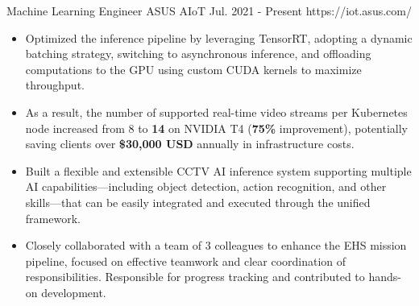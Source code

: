 

\begin{cventries}

\cventryexp
{Machine Learning Engineer} %
{ASUS AIoT} %
{Jul. 2021 - Present} %
{https://iot.asus.com/}
{
    \begin{cvitems} %
        \begin{itemize}
            \item Optimized the inference pipeline by leveraging TensorRT, adopting a 
            dynamic batching strategy, switching to asynchronous inference, and offloading 
            computations to the GPU using custom CUDA kernels to maximize throughput. 
            \item As a result, the number of supported real-time video streams per 
            Kubernetes node increased from 8 to \textbf{14} on NVIDIA T4 (\textbf{75\%} improvement), potentially 
            saving clients over \textbf{\$30,000 USD} annually in infrastructure costs.
        \end{itemize}
        \begin{itemize}
            \item Built a flexible and extensible CCTV AI inference system 
            supporting multiple AI capabilities—including object detection, 
            action recognition, and other skills—that can be easily integrated 
            and executed through the unified framework.
            \item Closely collaborated with a team of 3 colleagues to enhance the 
            EHS mission pipeline, focused on effective teamwork and clear coordination of 
            responsibilities. Responsible for progress tracking and contributed to hands-on 
            development.
        \end{itemize}

\end{cvitems}}
\end{cventries}

